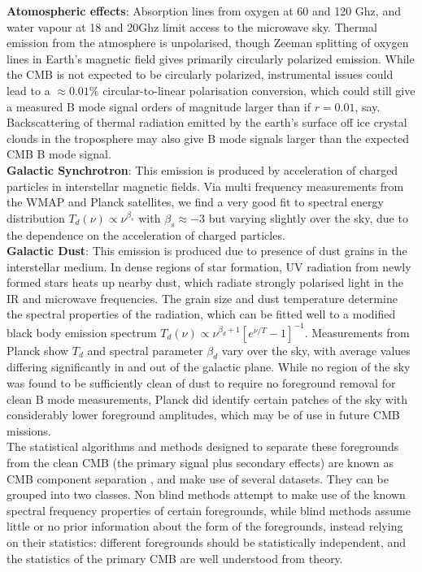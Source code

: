\documentclass[a4paper,10pt]{article}
\begin{document}
\textbf{Atomospheric effects}: Absorption lines from oxygen at 60 and 120 Ghz, and water vapour at 18 and 20Ghz limit access to the microwave sky. Thermal emission from the atmosphere is unpolarised, though Zeeman splitting of oxygen lines in Earth's magnetic field gives primarily circularly polarized emission. While the CMB is not expected to be circularly polarized, instrumental issues could lead to a $\approx 0.01\%$ circular-to-linear polarisation conversion, which could still give a measured B mode signal orders of magnitude larger than if $r=0.01$, say. Backscattering of thermal radiation emitted by the earth's surface off ice  crystal clouds in the troposphere may also give B mode signals larger than the expected CMB B mode signal. \\

\textbf{Galactic Synchrotron}: This emission is produced by acceleration of charged particles in interstellar magnetic fields. Via multi frequency measurements from the WMAP and Planck satellites, we find a very good fit to spectral energy distribution $T_d(\nu) \propto \nu^{\beta_s}$ with $\beta_s \approx -3$ but varying slightly over the sky, due to the dependence on the acceleration of charged particles.\\

\textbf{Galactic Dust}: This emission is produced due to presence of dust grains in the interstellar medium. In dense regions of star formation, UV radiation from newly formed stars heats up nearby dust, which radiate strongly polarised light in the IR and microwave frequencies. The grain size and dust temperature determine the spectral properties of the radiation, which can be fitted well to a modified black body emission spectrum $T_d(\nu) \propto \nu ^ {\beta_d+1}[e^{\nu/T}-1]^{-1}$. Measurements from Planck show $T_d$ and spectral parameter $\beta_d$ vary over the sky, with average values differing significantly in and out of the galactic plane. While no region of the sky was found to be sufficiently clean of dust to require no foreground removal for clean B mode measurements, Planck did identify certain patches of the sky with considerably lower foreground amplitudes, which may be of use in future CMB missions. \\

The statistical algorithms and methods designed to separate these foregrounds from the clean CMB (the primary signal plus secondary effects) are known as CMB component separation \cite{componentsep}, and make use of several datasets. They can be grouped into two classes. Non blind methods attempt to make use of the known spectral frequency properties of certain foregrounds, while blind methods assume little or no prior information about the form of the foregrounds, instead relying on their statistics: different foregrounds should be statistically independent, and the statistics of the primary CMB are well understood from theory.\\
\end{document}
